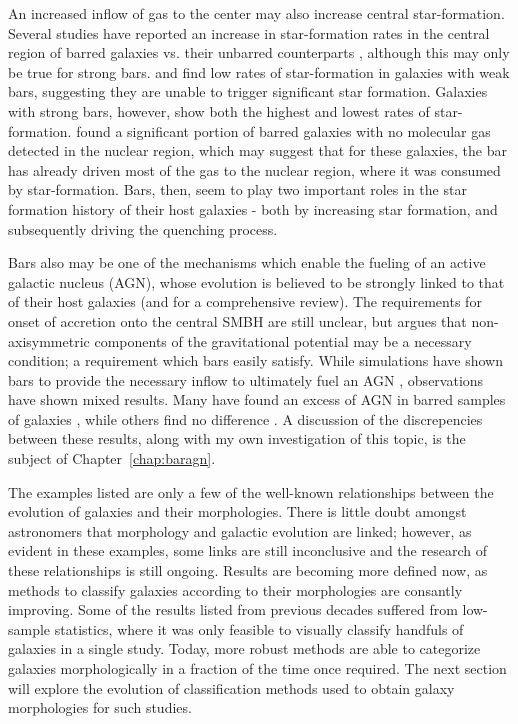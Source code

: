 An increased inflow of gas to the center may also increase central star-formation. Several studies have reported an increase in star-formation rates in the central region of barred galaxies vs. their unbarred counterparts \citep{Hawarden1986,Ho1997}, although this may only be true for strong bars. \citet{Martinet1997} and \citet{Zhou2014} find low rates of star-formation in galaxies with weak bars, suggesting they are unable to trigger significant star formation. Galaxies with strong bars, however, show both the highest and lowest rates of star-formation. \citep{Sheth2005} found a significant portion of barred galaxies with no molecular gas detected in the nuclear region, which may suggest that for these galaxies, the bar has already driven most of the gas to the nuclear region, where it was consumed by star-formation. Bars, then, seem to play two important roles in the star formation history of their host galaxies - both by increasing star formation, and subsequently driving the quenching process.

Bars also may be one of the mechanisms which enable the fueling of an active galactic nucleus (AGN), whose evolution is believed to be strongly linked to that of their host galaxies \citep{Schawinski2007, Schawinski2010, Antonini2015, Yang2017, Zubovas2017} (and \citet{Heckman2014} for a comprehensive review). The requirements for onset of accretion onto the central SMBH are still unclear, but \citet{Moles1995} argues that non-axisymmetric components of the gravitational potential may be a necessary condition; a requirement which bars easily satisfy. While simulations have shown bars to provide the necessary inflow to ultimately fuel an AGN \citep{Athanassoula1992,Friedli1993}, observations have shown mixed results. Many have found an excess of AGN in barred samples of galaxies \citep{Knapen2000,Oh2012}, while others find no difference \citep{Ho1997,Mulchaey1997,Cheung2015}. A discussion of the discrepencies between these results, along with my own investigation of this topic, is the subject of Chapter~\ref{chap:baragn}. 

The examples listed are only a few of the well-known relationships between the evolution of galaxies and their morphologies. There is little doubt amongst astronomers that morphology and galactic evolution are linked; however, as evident in these examples, some links are still inconclusive and the research of these relationships is still ongoing. Results are becoming more defined now, as methods to classify galaxies according to their morphologies are consantly improving. Some of the results listed from previous decades suffered from low-sample statistics, where it was only feasible to visually classify handfuls of galaxies in a single study. Today, more robust methods are able to categorize galaxies morphologically in a fraction of the time once required. The next section will explore the evolution of classification methods used to obtain galaxy morphologies for such studies. 


